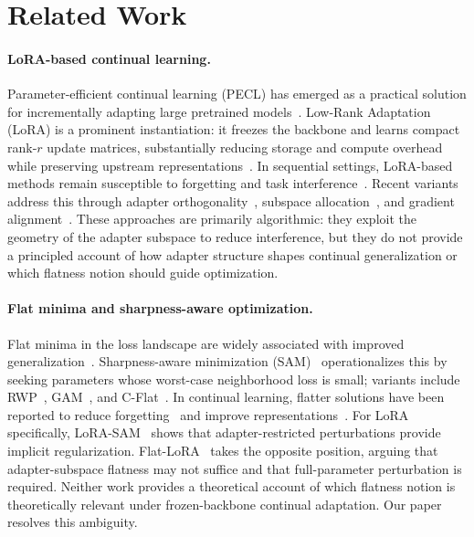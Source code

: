 \section{Related Work}
\label{sec:related}

\paragraph{LoRA-based continual learning.}
Parameter-efficient continual learning (PECL) has emerged as a practical solution for incrementally adapting large pretrained models~\citep{pmlr-v97-houlsby19a,Wang_2022_CVPR,dingParameterefficientFinetuningLargescale2023,xu2023parameterefficientfinetuningmethodspretrained}.
Low-Rank Adaptation (LoRA) is a prominent instantiation: it freezes the backbone and learns compact rank-$r$ update matrices, substantially reducing storage and compute overhead while preserving upstream representations~\citep{hu2022lora}.
In sequential settings, LoRA-based methods remain susceptible to forgetting and task interference~\citep{Gao_2023_ICCV,yang2024parametercollisionhinderingcontinual,10.1145/3730436.3730456}.
Recent variants address this through adapter orthogonality~\citep{wang2023orthogonal}, subspace allocation~\citep{wu2025sdlorascalabledecoupledlowrank}, and gradient alignment~\citep{Liang_2024_CVPR}.
These approaches are primarily algorithmic: they exploit the geometry of the adapter subspace to reduce interference, but they do not provide a principled account of how adapter structure shapes continual generalization or which flatness notion should guide optimization.

\paragraph{Flat minima and sharpness-aware optimization.}
Flat minima in the loss landscape are widely associated with improved generalization~\citep{FlatMinima1997,wu2017understandinggeneralizationdeeplearning,chaudhariEntropySGDBiasingGradient2019,NEURIPS2021_995f5e03,JMLRAnEmpiricalInvestigatio,yangRevisitingFlatnessAwareOptimization2025}.
Sharpness-aware minimization (SAM)~\citep{foretSharpnessAwareMinimizationEfficiently2021} operationalizes this by seeking parameters whose worst-case neighborhood loss is small; variants include RWP~\citep{pmlr-v151-bisla22a}, GAM~\citep{Zhang_GAM}, and C-Flat~\citep{NEURIPS2024_C-Flat}.
In continual learning, flatter solutions have been reported to reduce forgetting~\citep{NEURIPS2020_518a38cc,shiOvercomingCatastrophicForgetting2021,liRevisitingCatastrophicForgetting2024} and improve representations~\citep{hu2022doesselfsupervisedpretrainingperform}.
For LoRA specifically, LoRA-SAM~\citep{NEURIPS2024_4eb2c0ad} shows that adapter-restricted perturbations provide implicit regularization.
Flat-LoRA~\citep{li2024flatlora} takes the opposite position, arguing that adapter-subspace flatness may not suffice and that full-parameter perturbation is required.
Neither work provides a theoretical account of which flatness notion is theoretically relevant under frozen-backbone continual adaptation.
Our paper resolves this ambiguity.

